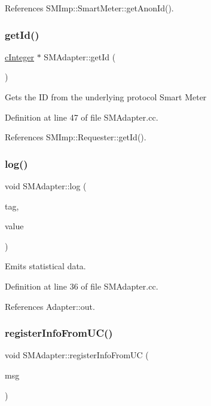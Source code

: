 References S\+M\+Imp\+::\+Smart\+Meter\+::get\+Anon\+Id().

\mbox{\label{classSMAdapter_a3568d35fe2de8828cb6fcaf0bd9d9923}} 
\subsubsection{\texorpdfstring{get\+Id()}{getId()}}
{\footnotesize\ttfamily \hyperlink{classcInteger}{c\+Integer} $\ast$ S\+M\+Adapter\+::get\+Id (\begin{DoxyParamCaption}{ }\end{DoxyParamCaption})}

Gets the ID from the underlying protocol Smart Meter 

Definition at line 47 of file S\+M\+Adapter.\+cc.



References S\+M\+Imp\+::\+Requester\+::get\+Id().

\mbox{\label{classSMAdapter_aecfd03fc0facc3c1a9b43cedce2d026a}} 
\subsubsection{\texorpdfstring{log()}{log()}}
{\footnotesize\ttfamily void S\+M\+Adapter\+::log (\begin{DoxyParamCaption}\item[{char $\ast$}]{tag,  }\item[{double}]{value }\end{DoxyParamCaption})}

Emits statistical data. 

Definition at line 36 of file S\+M\+Adapter.\+cc.



References Adapter\+::out.

\mbox{\label{classSMAdapter_ad35493a50872a683b4b5e0671f783769}} 
\subsubsection{\texorpdfstring{register\+Info\+From\+U\+C()}{registerInfoFromUC()}}
{\footnotesize\ttfamily void S\+M\+Adapter\+::register\+Info\+From\+UC (\begin{DoxyParamCaption}\item[{omnetpp\+::c\+Message $\ast$}]{msg }\end{DoxyParamCaption})}

